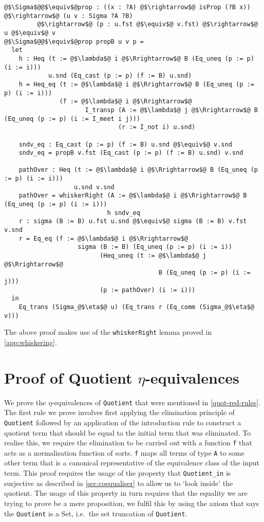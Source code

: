 \documentclass[12pt,twoside,maitrise]{dms}
\theoremstyle{definition}
\numberwithin{equation}{section}
\numberwithin{table}{chapter}
\numberwithin{figure}{chapter}
\newcommand\id[1] {\texttt{#1}}
\begin{document}
\begin{verbatim}
@$\Sigma$@@$\equiv$@prop : ((x : ?A) @$\rightarrow$@ isProp (?B x)) @$\rightarrow$@ (u v : Sigma ?A ?B)
         @$\rightarrow$@ (p : u.fst @$\equiv$@ v.fst) @$\rightarrow$@ u @$\equiv$@ v
@$\Sigma$@@$\equiv$@prop propB u v p =
  let
    h : Heq (t := @$\lambda$@ i @$\Rrightarrow$@ B (Eq_uneq (p := p) (i := i)))
            u.snd (Eq_cast (p := p) (f := B) u.snd)
    h = Heq_eq (t := @$\lambda$@ i @$\Rrightarrow$@ B (Eq_uneq (p := p) (i := i)))
               (f := @$\lambda$@ i @$\Rrightarrow$@
                      I_transp (A := @$\lambda$@ j @$\Rrightarrow$@ B (Eq_uneq (p := p) (i := I_meet i j)))
                               (r := I_not i) u.snd)

    sndv_eq : Eq_cast (p := p) (f := B) u.snd @$\equiv$@ v.snd
    sndv_eq = propB v.fst (Eq_cast (p := p) (f := B) u.snd) v.snd

    pathOver : Heq (t := @$\lambda$@ i @$\Rrightarrow$@ B (Eq_uneq (p := p) (i := i)))
                   u.snd v.snd
    pathOver = whiskerRight (A := @$\lambda$@ i @$\Rrightarrow$@ B (Eq_uneq (p := p) (i := i)))
                            h sndv_eq
    r : sigma (B := B) u.fst u.snd @$\equiv$@ sigma (B := B) v.fst v.snd
    r = Eq_eq (f := @$\lambda$@ i @$\Rrightarrow$@
                    sigma (B := B) (Eq_uneq (p := p) (i := i))
                          (Heq_uneq (t := @$\lambda$@ j @$\Rrightarrow$@
                                          B (Eq_uneq (p := p) (i := j)))
                          (p := pathOver) (i := i)))
  in
    Eq_trans (Sigma_@$\eta$@ u) (Eq_trans r (Eq_comm (Sigma_@$\eta$@ v)))
\end{verbatim}

The above proof makes use of the \id{whiskerRight} lemma proved in
\autoref{app:whiskering}.

\section{Proof of Quotient $\eta$-equivalences}\label{app:quotient-eta}

We prove the $\eta$-equivalences of \id{Quotient} that were mentioned in
\autoref{quot-red-rules}. The first rule we prove involves first applying the
elimination principle of \id{Quotient} followed by an application of the
introduction rule to construct a quotient term that should be equal to the
initial term that was eliminated. To realise this, we require the elimination to
be carried out with a function \id{f} that acts as a normalisation function of
sorts. \id{f} maps all terms of type \id{A} to some other term that is a
canonical representative of the equivalence class of the input term. This proof
requires the usage of the property that \id{Quotient\_in} is surjective as
described in \autoref{sec:coequaliser} to allow us to `look inside' the
quotient. The usage of this property in turn requires that the equality we are
trying to prove be a mere proposition, we fulfil this by using the axiom that
says the \id{Quotient} is a Set, i.e.\ the set truncation of \id{Quotient}.
\end{document}
